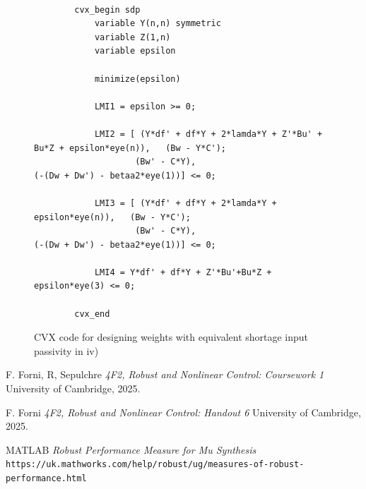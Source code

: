 \documentclass{article}
\begin{document}
\begin{figure}[H]
    \centering
    \begin{lstlisting}
        
        cvx_begin sdp
            variable Y(n,n) symmetric
            variable Z(1,n)
            variable epsilon

            minimize(epsilon)

            LMI1 = epsilon >= 0;
            
            LMI2 = [ (Y*df' + df*Y + 2*lamda*Y + Z'*Bu' + Bu*Z + epsilon*eye(n)),   (Bw - Y*C');
                    (Bw' - C*Y),                                (-(Dw + Dw') - betaa2*eye(1))] <= 0;
                
            LMI3 = [ (Y*df' + df*Y + 2*lamda*Y + epsilon*eye(n)),   (Bw - Y*C');
                    (Bw' - C*Y),                                (-(Dw + Dw') - betaa2*eye(1))] <= 0;
            
            LMI4 = Y*df' + df*Y + Z'*Bu'+Bu*Z + epsilon*eye(3) <= 0;

        cvx_end
    \end{lstlisting}
    \caption{CVX code for designing weights with equivalent shortage input passivity in iv)}
    \label{fig:equivalent_shortage_input_passivity_lmi}
\end{figure}


\begin{thebibliography}{9}

    
      F. Forni, R, Sepulchre
      \emph{4F2, Robust and Nonlinear Control: Coursework 1}
      University of Cambridge,
      2025.

      F. Forni
      \emph{4F2, Robust and Nonlinear Control: Handout 6}
      University of Cambridge,
      2025.
    
      MATLAB
      \emph{Robust Performance Measure for Mu Synthesis}
      \texttt{https://uk.mathworks.com/help/robust/ug/measures-of-robust-performance.html}

    
\end{thebibliography}
\end{document}
